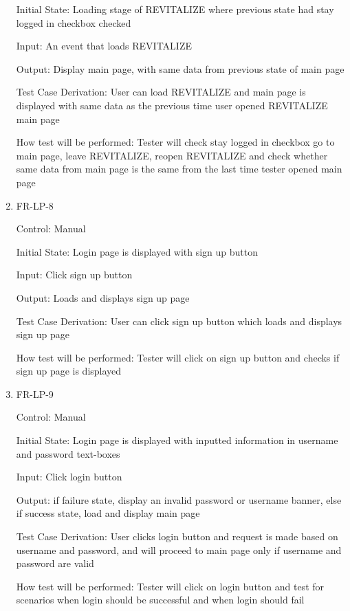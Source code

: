 \documentclass[12pt, titlepage]{article}
\begin{document}
\begin{enumerate}
	Initial State: Loading stage of REVITALIZE where previous state had stay logged in checkbox checked
	
	Input: An event that loads REVITALIZE
	
	Output: Display main page, with same data from previous state of main page
	
	Test Case Derivation: User can load REVITALIZE and main page is displayed with same data as the previous time user opened REVITALIZE main page
	
	How test will be performed: Tester will check stay logged in checkbox go to main page, leave REVITALIZE, reopen REVITALIZE and check whether same data from main page is the same from the last time tester opened main page
	
	\item{FR-LP-8\\}
	
	Control: Manual
	
	Initial State: Login page is displayed with sign up button
	
	Input: Click sign up button
	
	Output: Loads and displays sign up page
	
	Test Case Derivation: User can click sign up button which loads and displays sign up page
	
	How test will be performed: Tester will click on sign up button and checks if sign up page is displayed
	
	\item{FR-LP-9\\}
	
	Control: Manual
	
	Initial State: Login page is displayed with inputted information in username and password text-boxes
	
	Input: Click login button
	
	Output: if failure state, display an invalid password or username banner, else if success state, load and display main page
	
	Test Case Derivation: User clicks login button and request is made based on username and password, and will proceed to main page only if username and password are valid
	
	How test will be performed: Tester will click on login button and test for scenarios when login should be successful and when login should fail
	
	
\end{enumerate}
\end{document}
